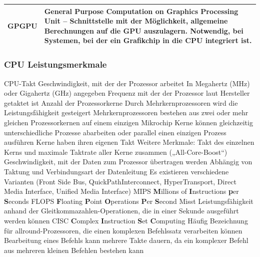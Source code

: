 \documentclass[10pt]{article}
\begin{document}
\begin{flushleft}
\begin{longtable}{|p{}|p{}|}
        \\\hline

        \textbf{GPGPU} & General Purpose Computation on Graphics Processing Unit – Schnittstelle mit der Möglichkeit, allgemeine Berechnungen auf die GPU auszulagern. Notwendig, bei Systemen, bei der ein Grafikchip in die CPU integriert ist.
        
        \\\hline
\end{longtable}

\subsubsection{CPU Leistungsmerkmale}

\begin{outline}
    \1 CPU-Takt
        \2 Geschwindigkeit, mit der der Prozessor arbeitet
        \2 In Megahertz (MHz) oder Gigahertz (GHz) angegeben
        \2 Frequenz mit der der Prozessor laut Hersteller getaktet ist
    \1 Anzahl der Prozessorkerne
        \2 Durch Mehrkernprozessoren wird die Leistungsfähigkeit gesteigert
        \2 Mehrkernprozessoren bestehen aus zwei oder mehr gleichen Prozessorkernen auf einem einzigen Mikrochip
        \2 Kerne können gleichzeitig unterschiedliche Prozesse abarbeiten oder parallel einen einzigen Prozess ausführen
        \2 Kerne haben ihren eigenen Takt
        \2 \textrightarrow Weitere Merkmale: Takt des einzelnen Kerns und maximale Taktrate aller Kerne zusammen („All-Core-Boost“)
    \1 Geschwindigkeit, mit der Daten zum Prozessor übertragen werden
        \2 Abhängig von Taktung und Verbindungsart der Datenleitung
        \2 Es existieren verschiedene Varianten (Front Side Bus, QuickPathInterconnect, HyperTransport, Direct Media Interface, Unified Media Interface)
    \1 MIPS
        \2 \textbf{M}illions of \textbf{I}nstructions \textbf{p}er \textbf{S}econds
    \1 FLOPS
        \2 \textbf{F}loating \textbf{P}oint \textbf{O}perations \textbf{P}er \textbf{S}econd
        \2 Misst Leistungsfähigkeit anhand der Gleitkommazahlen-Operationen, die in einer Sekunde ausgeführt werden können
    \1 CISC
        \2 \textbf{C}omplex \textbf{I}nstruction \textbf{S}et \textbf{C}omputing
        \2 Häufig Bezeichnung für allround-Prozessoren, die einen komplexen Befehlssatz verarbeiten können
        \2 Bearbeitung eines Befehls kann mehrere Takte dauern, da ein komplexer Befehl aus mehreren kleinen Befehlen bestehen kann

\break
\break


\end{outline}
\end{flushleft}
\end{document}
